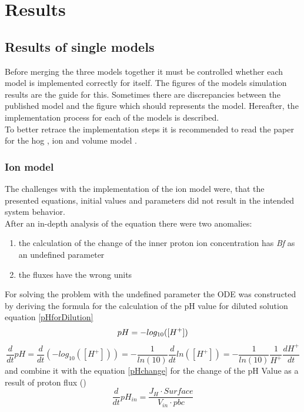 \section{Results}
\subsection{Results of single models}
Before merging the three models together it must be controlled whether each model is implemented correctly for itself. The figures of the models simulation results are the guide for this. Sometimes there are discrepancies between the published model and the figure which should represents the model.  Hereafter, the implementation process for each of the models is described.\\
To better retrace the implementation steps it is recommended to read the paper for the hog \cite{Zi_2010}, ion \cite{Gerber_2016} and volume model  \cite{volumeModel}.

\subsubsection{Ion model}
The challenges with the implementation of the ion model were, that the presented equations, initial values and parameters did not result in the intended system behavior. \\
After an in-depth analysis of the equation there were two anomalies:

\begin{enumerate}
	\item the calculation of the change of the inner proton ion concentration has \emph{Bf} as an undefined parameter
	\item the fluxes have the wrong units
\end{enumerate}

For solving the problem with the undefined parameter the ODE was constructed by deriving the formula for the calculation of the pH value for diluted solution equation \ref{pHforDilution}
\begin{equation*}
	pH = - log_{10}([H^+])\\
\end{equation*}
\begin{equation}\label{pHforDilution}
	\frac{d}{dt}pH = \frac{d}{dt}(-log_{10}([H^+])) = - \frac{1}{ln(10)} \frac{d}{dt}ln([H^+]) = - \frac{1}{ln(10)}\frac{1}{H^+} \frac{dH^+}{dt}
\end{equation}
and combine it with the equation \ref{pHchange} for the change of the pH Value as a result of proton flux (\cite{martinafroehlich})
\begin{equation}\label{pHchange}
	\frac{d}{dt}pH_{in} = \frac{J_H \cdot Surface}{V_{in} \cdot pbc}
\end{equation}
	

